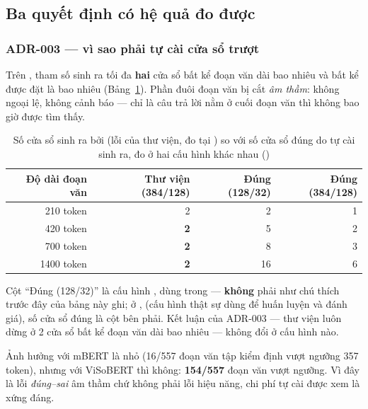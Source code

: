 \subsection{Ba quyết định có hệ quả đo được}

\subsubsection*{ADR-003 --- vì sao phải tự cài cửa sổ trượt}

Trên , tham số  sinh ra tối đa
\textbf{hai} cửa sổ bất kể đoạn văn dài bao nhiêu và bất kể  được đặt là bao
nhiêu (Bảng~\ref{tab:windowbug}). Phần đuôi đoạn văn bị cắt \emph{âm thầm}: không ngoại lệ,
không cảnh báo --- chỉ là câu trả lời nằm ở cuối đoạn văn thì không bao giờ được tìm thấy.

\begin{table}[H]
\centering
\caption{Số cửa sổ sinh ra bởi  (lỗi của thư viện, đo tại
) so với số cửa sổ đúng do  tự cài sinh ra, đo ở
hai cấu hình khác nhau ()}
\label{tab:windowbug}
\renewcommand{\arraystretch}{1.15}
\small
\begin{tabular}{@{}rrrr@{}}
\toprule
\textbf{Độ dài đoạn văn} & \textbf{Thư viện (384/128)} &
\textbf{Đúng (128/32)} & \textbf{Đúng (384/128)} \\
\midrule
210 token  & 2 & 2 & 1 \\
420 token  & \textbf{2} & 5 & 2 \\
700 token  & \textbf{2} & 8 & 3 \\
1400 token & \textbf{2} & 16 & 6 \\
\bottomrule
\end{tabular}
\par\vspace{2pt}
{\footnotesize Cột ``Đúng (128/32)'' là cấu hình , 
dùng trong  --- \textbf{không} phải  như
chú thích trước đây của bảng này ghi; ở ,  (cấu
hình thật sự dùng để huấn luyện và đánh giá), số cửa sổ đúng là cột bên phải. Kết luận của
ADR-003 --- thư viện luôn dừng ở 2 cửa sổ bất kể đoạn văn dài bao nhiêu --- không đổi ở cấu
hình nào.}
\end{table}

Ảnh hưởng với mBERT là nhỏ (16/557 đoạn văn tập kiểm định vượt ngưỡng 357 token), nhưng với
ViSoBERT thì không: \textbf{154/557} đoạn văn vượt ngưỡng. Vì đây là lỗi \emph{đúng--sai} âm
thầm chứ không phải lỗi hiệu năng, chi phí tự cài được xem là xứng đáng.

